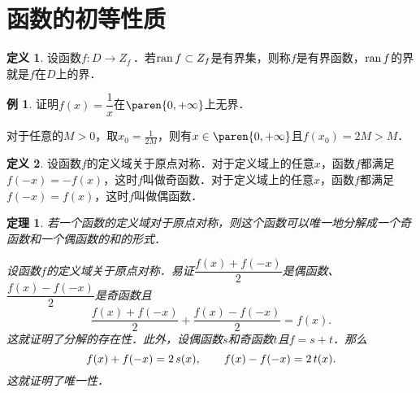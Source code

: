 \documentclass[a4paper,punct=CCT]{ctexbook}
\makeatletter
\newtheorem*{theorem*}{定理}
\theoremstyle{definition}
\newtheorem*{definition*}{定义}
\newtheorem*{example*}{例}
\theoremstyle{remark}
\renewcommand*{\proofname}{证}
\renewenvironment{proof}[1][\proofname]{\par
  \pushQED{\qed}%
  \normalfont \topsep6\p@\@plus6\p@\relax
  \trivlist
  \item[\hskip\labelsep
    \bfseries
    #1%
    ]\ignorespaces
}{%
  \popQED\endtrivlist\@endpefalse
}
\makeatother
\begin{document}
\section{函数的初等性质\label{sec:funcprops}}

\begin{definition*}
  设函数\(f\colon D \to Z_f\)\,．若\(\operatorname{ran} f \subset Z_f\)是有界集，则称\(f\)是有界函数，\(\operatorname{ran} f\)的界就是\(f\)在\(D\)上的界．
\end{definition*}

\begin{example*}
  证明\(f(x) = \dfrac1x\)在\(\paren{0,+\infty}\)上无界．

  \begin{proof}
    对于任意的\(M > 0\)，取\(x_0 = \frac1{2M}\)，则有\(x \in \paren{0,+\infty}\)且\(f(x_0) = 2M > M\)．
  \end{proof}
\end{example*}

\begin{definition*}
  设函数\(f\)的定义域关于原点对称．对于定义域上的任意\(x\)，函数\(f\)都满足\(f(-x) = -f(x)\)，这时\(f\)叫做奇函数．对于定义域上的任意\(x\)，函数\(f\)都满足\(f(-x) = f(x)\)，这时\(f\)叫做偶函数．
\end{definition*}

\hypertarget{T:evenodd}{}
\begin{theorem*}
  若一个函数的定义域对于原点对称，则这个函数可以唯一地分解成一个奇函数和一个偶函数的和的形式．

  \begin{proof}
    设函数\(f\)的定义域关于原点对称．易证\(\dfrac{f(x)+f(-x)}{2}\)是偶函数、\(\dfrac{f(x)-f(-x)}{2}\)是奇函数且
    \[
      \frac{f(x)+f(-x)}{2} + \frac{f(x)-f(-x)}{2} = f(x).
    \]
    这就证明了分解的存在性．此外，设偶函数\(s\)和奇函数\(t\)且\(f = s + t\)．那么
    \[
      f(x) + f(-x) = 2\mathop{\relax\kern0pt s}\nolimits(x),
      \qquad
      f(x) - f(-x) = 2\mathop{\relax\kern0pt t}\nolimits(x).
    \]
    这就证明了唯一性．
  \end{proof}
\end{theorem*}
\end{document}
